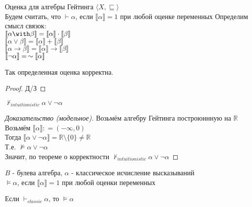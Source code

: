 \begin{definition} Оценка для алгебры Гейтинга $\langle{}X, \sqsubseteq \rangle$ \\
	Будем считать, что $\vdash \alpha$, если $ \llbracket \alpha \rrbracket = 1$ при любой оценке переменных
	Определим смысл связок: \\
	$\llbracket \alpha \with \beta \rrbracket = \llbracket \alpha \rrbracket \cdot \llbracket \beta \rrbracket$\\
	$\llbracket \alpha \vee \beta \rrbracket = \llbracket \alpha \rrbracket + \llbracket \beta \rrbracket$\\
	$\llbracket \alpha \rightarrow \beta \rrbracket = \llbracket \alpha \rrbracket \rightarrow \llbracket \beta \rrbracket $\\
	$\llbracket \neg \alpha \rrbracket = \thinspace \sim \llbracket \alpha \rrbracket $
\end{definition}

\begin{theorem}
	Так определенная оценка корректна.
\end{theorem}
\begin{proof}
	Д/З
\end{proof}
\begin{theorem}
	$ \nvdash_{intuitionistic} \alpha \vee \neg \alpha$
\end{theorem}
\begin{proof} [Доказательство (модельное)] 
	Возьмём алгебру Гейтинга построюннную на $\mathbb{R}$ \\
	Возьмём $\llbracket \alpha \rrbracket : = (-\infty, 0)$ \\
	Тогда $\llbracket \alpha \vee \neg \alpha \rrbracket = \mathbb{R} \setminus \{0\} \neq \mathbb{R} $ \\
	Т.е. $\nvDash \alpha \vee \neg \alpha$ \\
	Значит, по теореме о корректности $ \nvdash_{intuitionistic} \alpha \vee \neg \alpha$
\end{proof}

\begin{definition}
	$B$ - булева алгебра, $\alpha$ - классическое исчисление высказываний \\
	$ \vDash \alpha$, если $ \llbracket \alpha \rrbracket = 1$ при любой оценки переменных
\end{definition}

\begin{theorem}
	Если $\vdash_{classic} \alpha$, то 	$ \vDash \alpha$
\end{theorem}